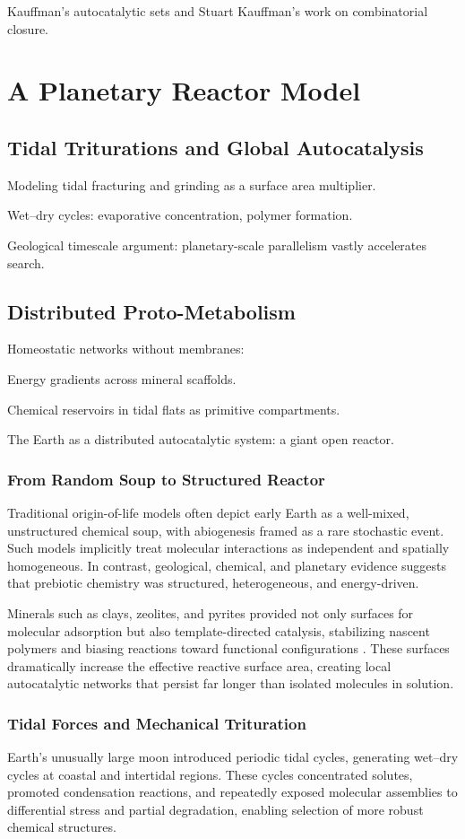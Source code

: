 \documentclass{book}
\begin{document}
Kauffman’s autocatalytic sets and Stuart Kauffman’s work on combinatorial closure.

\part{A Planetary Reactor Model}

\chapter{Tidal Triturations and Global Autocatalysis}
Modeling tidal fracturing and grinding as a surface area multiplier.

Wet–dry cycles: evaporative concentration, polymer formation.

Geological timescale argument: planetary-scale parallelism vastly accelerates search.

\chapter{Distributed Proto-Metabolism}
Homeostatic networks without membranes:

Energy gradients across mineral scaffolds.

Chemical reservoirs in tidal flats as primitive compartments.

The Earth as a distributed autocatalytic system: a giant open reactor.

\section{From Random Soup to Structured Reactor}
Traditional origin-of-life models often depict early Earth as a well-mixed, unstructured chemical soup, with abiogenesis framed as a rare stochastic event. Such models implicitly treat molecular interactions as independent and spatially homogeneous. In contrast, geological, chemical, and planetary evidence suggests that prebiotic chemistry was structured, heterogeneous, and energy-driven.

Minerals such as clays, zeolites, and pyrites provided not only surfaces for molecular adsorption but also template-directed catalysis, stabilizing nascent polymers and biasing reactions toward functional configurations \citep{hazen2005}. These surfaces dramatically increase the effective reactive surface area, creating local autocatalytic networks that persist far longer than isolated molecules in solution.

\section{Tidal Forces and Mechanical Trituration}
Earth’s unusually large moon introduced periodic tidal cycles, generating wet–dry cycles at coastal and intertidal regions. These cycles concentrated solutes, promoted condensation reactions, and repeatedly exposed molecular assemblies to differential stress and partial degradation, enabling selection of more robust chemical structures.
\end{document}

